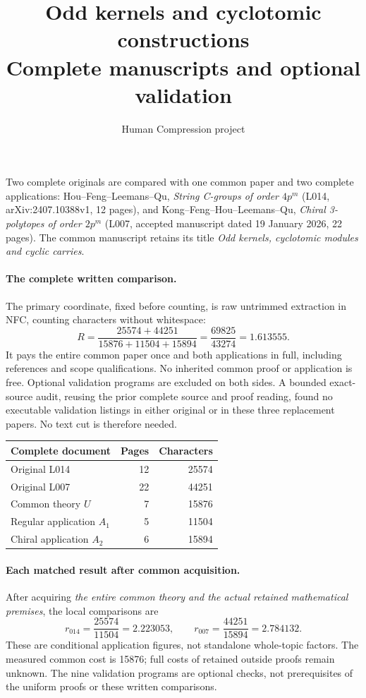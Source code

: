 \documentclass[11pt,a4paper]{article}
\title{Odd kernels and cyclotomic constructions\\Complete manuscripts and optional validation}
\author{Human Compression project}\date{}
\begin{document}
\maketitle
Two complete originals are compared with one common paper and two complete
applications: Hou--Feng--Leemans--Qu, \emph{String C-groups of order $4p^m$}
(L014, arXiv:2407.10388v1, 12 pages), and Kong--Feng--Hou--Leemans--Qu,
\emph{Chiral 3-polytopes of order $2p^m$} (L007, accepted manuscript dated
19 January 2026, 22 pages). The common manuscript retains its title
\emph{Odd kernels, cyclotomic modules and cyclic carries}.

\paragraph{The complete written comparison.}
The primary coordinate, fixed before counting, is raw untrimmed extraction
in NFC, counting characters without whitespace:
\[
 R=\frac{25574+44251}{15876+11504+15894}
 =\frac{69825}{43274}=\mathbf{1.613555}.
\]
It pays the entire common paper once and both applications in full,
including references and scope qualifications. No inherited common proof or
application is free. Optional validation programs are excluded on both sides.
A bounded exact-source audit, reusing the prior complete source and proof
reading, found no executable validation listings in either original or in
these three replacement papers. No text cut is therefore needed.
\begin{center}\begin{tabular}{lrr}\toprule
Complete document&Pages&Characters\\\midrule
Original L014&12&25574\\
Original L007&22&44251\\
Common theory $U$&7&15876\\
Regular application $A_1$&5&11504\\
Chiral application $A_2$&6&15894\\\bottomrule
\end{tabular}\end{center}
\paragraph{Each matched result after common acquisition.}
After acquiring \emph{the entire common theory and the actual retained
mathematical premises}, the local comparisons are
\[
 r_{014}=\frac{25574}{11504}=2.223053,
 \qquad r_{007}=\frac{44251}{15894}=2.784132.
\]
These are conditional application figures, not standalone whole-topic factors.
The measured common cost is 15876; full costs of retained outside proofs remain
unknown. The nine validation programs are optional checks, not prerequisites
of the uniform proofs or these written comparisons.
\end{document}
